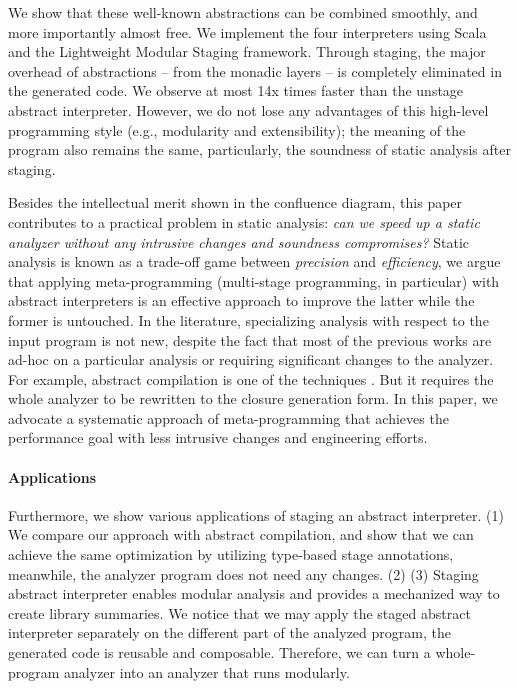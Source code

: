 We show that these well-known abstractions can be combined smoothly, and more
importantly almost free. We implement the four interpreters using Scala and the
Lightweight Modular Staging \cite{DBLP:conf/gpce/RompfO10} framework. Through
staging, the major overhead of abstractions -- from the monadic layers -- is
completely eliminated in the generated code. We observe at most 14x times faster
than the unstage abstract interpreter. However, we do not lose any advantages of
this high-level programming style (e.g., modularity and extensibility); the
meaning of the program also remains the same, particularly, the soundness of
static analysis after staging.

Besides the intellectual merit shown in the confluence diagram, this paper
contributes to a practical problem in static analysis: \textit{can we speed up a
static analyzer without any intrusive changes and soundness compromises?} Static
analysis is known as a trade-off game between \textit{precision} and
\textit{efficiency}, we argue that applying meta-programming (multi-stage
programming, in particular) with abstract interpreters is an effective approach
to improve the latter while the former is untouched.
In the literature, specializing analysis with respect to the input program
\cite{damian1999partial, amtoft1999partial, Boucher:1996:ACN:647473.727587,
ashley:practical} is not new, despite the fact that most of the previous works
are ad-hoc on a particular analysis or requiring significant changes to the
analyzer. For example, abstract compilation is one of the techniques
\cite{Boucher:1996:ACN:647473.727587}. But it requires the whole analyzer to be
rewritten to the closure generation form. In this paper, we advocate a systematic
approach of meta-programming that achieves the performance goal with less
intrusive changes and engineering efforts.

\paragraph{Applications}

Furthermore, we show various applications of staging an abstract interpreter.
(1) We compare our approach with abstract compilation, and show that we can
achieve the same optimization by utilizing type-based stage annotations,
meanwhile, the analyzer program does not need any changes. (2) \todo{} (3)
Staging abstract interpreter enables modular analysis and provides a mechanized
way to create library summaries. We notice that we may apply the staged abstract
interpreter separately on the different part of the analyzed program, the
generated code is reusable and composable. Therefore, we can turn a
whole-program analyzer into an analyzer that runs modularly.

